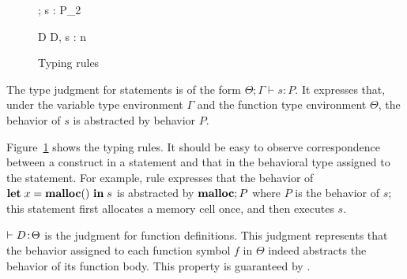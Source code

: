 \begin{figure}[tp]
\begin{minipage}{\textwidth}
\vspace{2mm}

{\Theta ; \Gamma \vdash s : P_{2}}

{\vdash D \COL \Theta}
{\vdash \langle D, s \rangle : n}

\end{minipage}
\caption{Typing rules}
\label{fig:typingrules}
\end{figure}



The type judgment for statements is of the form $\Theta ; \Gamma
\vdash s : P$.  It expresses that, under the variable type environment
\(\Gamma\) and the function type environment \(\Theta\), the behavior
of $s$ is abstracted by behavior $P$.


Figure~\ref{fig:typingrules} shows the typing rules.  It should be
easy to observe correspondence between a construct in a statement and
that in the behavioral type assigned to the statement.  For example,
rule  expresses that the behavior of \(\mathbf{let}\; x =
\mathbf{malloc}()\ \mathbf{in}\; s\) is abstracted by \(\mathbf{malloc}; P\) where \(P\) is the
behavior of \(s\); this statement first allocates a memory cell once,
and then executes \(s\).

\(\vdash D \!:\! \Theta\) is the judgment for function definitions.
This judgment represents that the behavior assigned to each function
symbol \(f\) in \(\Theta\) indeed abstracts the behavior of its
function body.  This property is guaranteed by .

